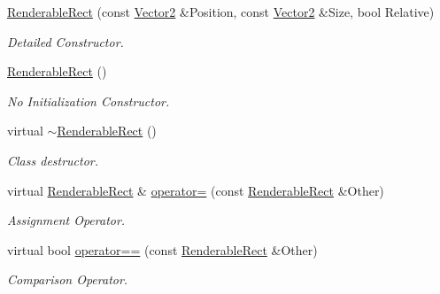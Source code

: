 \begin{DoxyCompactItemize}
\item 
\hyperlink{structMezzanine_1_1UI_1_1RenderableRect_a22e6469509e95787d02b16da0962de3a}{RenderableRect} (const \hyperlink{classMezzanine_1_1Vector2}{Vector2} \&Position, const \hyperlink{classMezzanine_1_1Vector2}{Vector2} \&Size, bool Relative)
\begin{DoxyCompactList}\small\item\em Detailed Constructor. \item\end{DoxyCompactList}\item 
\hyperlink{structMezzanine_1_1UI_1_1RenderableRect_a92a23fe9e3de387d118b5350d31fe8be}{RenderableRect} ()
\begin{DoxyCompactList}\small\item\em No Initialization Constructor. \item\end{DoxyCompactList}\item 
\hypertarget{structMezzanine_1_1UI_1_1RenderableRect_ae8a333321b6939caa4d65d100faa8106}{
virtual \hyperlink{structMezzanine_1_1UI_1_1RenderableRect_ae8a333321b6939caa4d65d100faa8106}{$\sim$RenderableRect} ()}
\label{structMezzanine_1_1UI_1_1RenderableRect_ae8a333321b6939caa4d65d100faa8106}

\begin{DoxyCompactList}\small\item\em Class destructor. \item\end{DoxyCompactList}\item 
virtual \hyperlink{structMezzanine_1_1UI_1_1RenderableRect}{RenderableRect} \& \hyperlink{structMezzanine_1_1UI_1_1RenderableRect_ab93ab3f67ab27f221fdda5730b959be0}{operator=} (const \hyperlink{structMezzanine_1_1UI_1_1RenderableRect}{RenderableRect} \&Other)
\begin{DoxyCompactList}\small\item\em Assignment Operator. \item\end{DoxyCompactList}\item 
virtual bool \hyperlink{structMezzanine_1_1UI_1_1RenderableRect_a2da1af5227c8958bc047f9d315c9b7cd}{operator==} (const \hyperlink{structMezzanine_1_1UI_1_1RenderableRect}{RenderableRect} \&Other)
\begin{DoxyCompactList}\small\item\em Comparison Operator. \item\end{DoxyCompactList}\end{DoxyCompactItemize}
